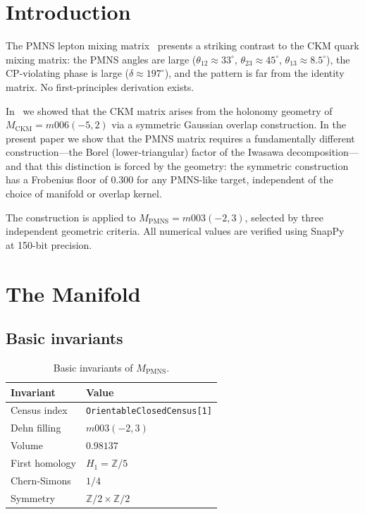\documentclass[11pt,a4paper]{article}
\theoremstyle{definition}
\newcommand{\MPMNS}{M_{\mathrm{PMNS}}}
\newcommand{\Zfive}{\mathbb{Z}/5}
\begin{document}
\maketitle

\section{Introduction}
\label{sec:intro}

The PMNS lepton mixing matrix~\cite{Maki1962,PDG2024} presents a
striking contrast to the CKM quark mixing matrix: the PMNS angles are
large ($\theta_{12}\approx33^\circ$, $\theta_{23}\approx45^\circ$,
$\theta_{13}\approx8.5^\circ$), the CP-violating phase is large
($\delta\approx197^\circ$), and the pattern is far from the identity
matrix. No first-principles derivation exists.

In~\cite{Gentry:CKM} we showed that the CKM matrix arises from the
holonomy geometry of $M_{\mathrm{CKM}}=m006(-5,2)$ via a symmetric
Gaussian overlap construction. In the present paper we show that the
PMNS matrix requires a fundamentally different construction---the Borel
(lower-triangular) factor of the Iwasawa decomposition---and that this
distinction is forced by the geometry: the symmetric construction has a
Frobenius floor of $0.300$ for any PMNS-like target, independent of
the choice of manifold or overlap kernel.

The construction is applied to $\MPMNS=m003(-2,3)$, selected by
three independent geometric criteria. All numerical values are
verified using SnapPy~\cite{SnapPy} at 150-bit precision.

\section{The Manifold}
\label{sec:manifold}

\subsection{Basic invariants}

\begin{table}[htbp]
\centering
\caption{Basic invariants of $\MPMNS$.}
\begin{tabular}{ll}
\toprule
Invariant & Value \\
\midrule
Census index & \texttt{OrientableClosedCensus[1]} \\
Dehn filling & $m003(-2,3)$ \\
Volume & $0.98137$ \\
First homology & $H_1 = \Zfive$ \\
Chern-Simons & $1/4$ \\
Symmetry & $\mathbb{Z}/2\times\mathbb{Z}/2$ \\
\bottomrule
\end{tabular}
\end{table}
\end{document}
